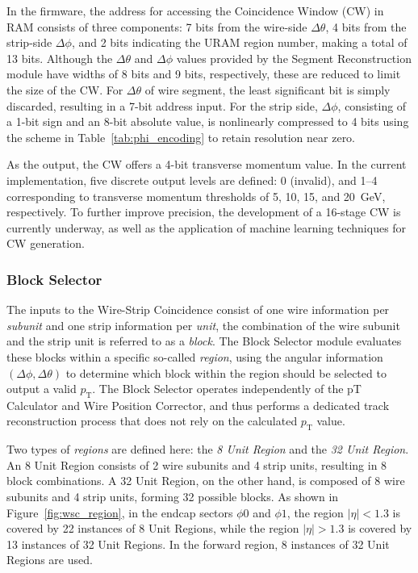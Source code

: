 In the firmware, the address for accessing the Coincidence Window (CW) in RAM consists of three components: 7 bits from the wire-side \(\Delta\theta\), 4 bits from the strip-side \(\Delta\phi\), and 2 bits indicating the URAM region number, making a total of 13 bits. Although the \(\Delta\theta\) and \(\Delta\phi\) values provided by the Segment Reconstruction module have widths of 8 bits and 9 bits, respectively, these are reduced to limit the size of the CW. For \(\Delta\theta\) of wire segment, the least significant bit is simply discarded, resulting in a 7-bit address input. For the strip side, \(\Delta\phi\), consisting of a 1-bit sign and an 8-bit absolute value, is nonlinearly compressed to 4 bits using the scheme in Table~\ref{tab:phi_encoding} to retain resolution near zero.



As the output, the CW offers a 4-bit transverse momentum value. In the current implementation, five discrete output levels are defined: 0 (invalid), and 1–4 corresponding to transverse momentum thresholds of 5, 10, 15, and 20~GeV, respectively. To further improve precision, the development of a 16-stage CW is currently underway, as well as the application of machine learning techniques for CW generation.

\subsubsection{Block Selector}

The inputs to the Wire-Strip Coincidence consist of one wire information per \textit{subunit} and one strip information per \textit{unit}, the combination of the wire subunit and the strip unit is referred to as a \textit{block}. The Block Selector module evaluates these blocks within a specific so-called \textit{region}, using the angular information \((\Delta\phi, \Delta\theta)\) to determine which block within the region should be selected to output a valid \(p_{\mathrm{T}}\). The Block Selector operates independently of the pT Calculator and Wire Position Corrector, and thus performs a dedicated track reconstruction process that does not rely on the calculated \(p_{\mathrm{T}}\) value.

Two types of \textit{regions} are defined here: the \textit{8 Unit Region} and the \textit{32 Unit Region}. An 8 Unit Region consists of 2 wire subunits and 4 strip units, resulting in 8 block combinations. A 32 Unit Region, on the other hand, is composed of 8 wire subunits and 4 strip units, forming 32 possible blocks. As shown in Figure~\ref{fig:wsc_region}, in the endcap sectors \(\phi0\) and \(\phi1\), the region \(|\eta| < 1.3\) is covered by 22 instances of 8 Unit Regions, while the region \(|\eta| > 1.3\) is covered by 13 instances of 32 Unit Regions. In the forward region, 8 instances of 32 Unit Regions are used.

